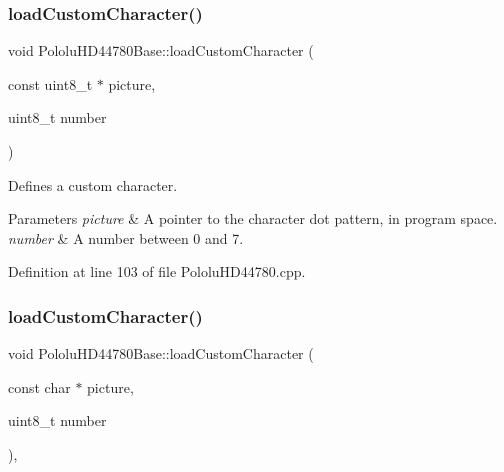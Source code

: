 \mbox{\label{class_pololu_h_d44780_base_a73d331af44ec2e624aa0468ce13f64e4}} 
\subsubsection{\texorpdfstring{load\+Custom\+Character()}{loadCustomCharacter()}\hspace{0.1cm}{\footnotesize\ttfamily [1/2]}}
{\footnotesize\ttfamily void Pololu\+H\+D44780\+Base\+::load\+Custom\+Character (\begin{DoxyParamCaption}\item[{const uint8\+\_\+t $\ast$}]{picture,  }\item[{uint8\+\_\+t}]{number }\end{DoxyParamCaption})\hspace{0.3cm}{\ttfamily [inherited]}}

Defines a custom character. 
\begin{DoxyParams}{Parameters}
{\em picture} & A pointer to the character dot pattern, in program space. \\
\hline
{\em number} & A number between 0 and 7. \\
\hline
\end{DoxyParams}


Definition at line 103 of file Pololu\+H\+D44780.\+cpp.

\mbox{\label{class_pololu_h_d44780_base_a4f22d613433fce0e0c661a237ade9aeb}} 
\subsubsection{\texorpdfstring{load\+Custom\+Character()}{loadCustomCharacter()}\hspace{0.1cm}{\footnotesize\ttfamily [2/2]}}
{\footnotesize\ttfamily void Pololu\+H\+D44780\+Base\+::load\+Custom\+Character (\begin{DoxyParamCaption}\item[{const char $\ast$}]{picture,  }\item[{uint8\+\_\+t}]{number }\end{DoxyParamCaption})\hspace{0.3cm}{\ttfamily [inline]}, {\ttfamily [inherited]}}

